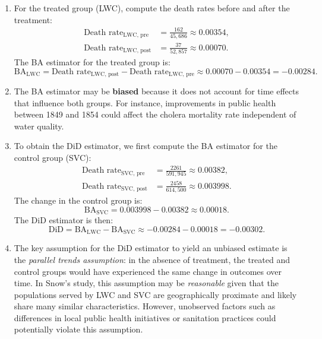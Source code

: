 \documentclass[11pt]{exam}
\begin{document}
\begin{questions}
\begin{solution}[0cm]
    \begin{enumerate}[label=(\alph*)]
    \item For the treated group (LWC), compute the death rates before and after the treatment:
    \begin{align*}
        \text{Death rate}_{\text{LWC, pre}} &= \frac{162}{45,686} \approx 0.00354, \\    
        \text{Death rate}_{\text{LWC, post}} &= \frac{37}{52,857} \approx 0.00070.
    \end{align*}
    The BA estimator for the treated group is:
    \[
    \mathrm{BA}_\text{LWC} = \text{Death rate}_{\text{LWC, post}} - \text{Death rate}_{\text{LWC, pre}} \approx 0.00070 - 0.00354 = \boxed{-0.00284}.
    \]
    
    \item The BA estimator may be \textbf{biased} because it does not account for time effects that influence both groups. For instance, improvements in public health between 1849 and 1854 could affect the cholera mortality rate independent of water quality.
    
    \item To obtain the DiD estimator, we first compute the BA estimator for the control group (SVC):
    \begin{align*}
        \text{Death rate}_{\text{SVC, pre}} &= \frac{2261}{591,945} \approx 0.00382, \\
        \text{Death rate}_{\text{SVC, post}} &= \frac{2458}{614,500} \approx 0.003998.
    \end{align*}
    The change in the control group is:
    \[
    \mathrm{BA}_\text{SVC} = 0.003998 - 0.00382 \approx 0.00018.
    \]
    The DiD estimator is then:
    \[
    \mathrm{DiD} = \mathrm{BA}_\text{LWC} - \mathrm{BA}_\text{SVC} \approx -0.00284 - 0.00018 = \boxed{-0.00302}.
    \]
    
    \item The key assumption for the DiD estimator to yield an unbiased estimate is the \emph{parallel trends assumption}: in the absence of treatment, the treated and control groups would have experienced the same change in outcomes over time. In Snow's study, this assumption may be \emph{reasonable} given that the populations served by LWC and SVC are geographically proximate and likely share many similar characteristics. However, unobserved factors such as differences in local public health initiatives or sanitation practices could potentially violate this assumption.
    \end{enumerate}
    
\end{solution}

\end{questions}	
\end{document}
